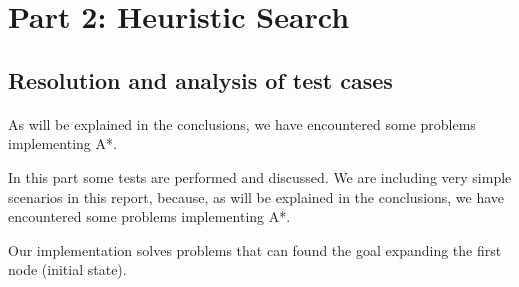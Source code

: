 
\section{Part 2: Heuristic Search}

\subsection{Resolution and analysis of test cases}

\paragraph{}
As will be explained in the conclusions, we have encountered some problems
implementing A*.

In this part some tests are performed and discussed. We are including very
simple scenarios in this report, because, as will be explained in the
conclusions, we have encountered some problems implementing A*.

Our implementation solves problems that can found the goal expanding the first
node (initial state).

